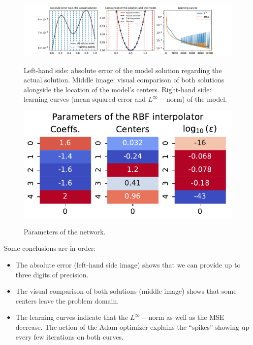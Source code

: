 \documentclass[12pt]{report} %
\begin{document}
\begin{figure}[ht]
  \hspace*{-2cm}
  {\includegraphics[width=1.25\textwidth, trim={2cm 0 2.5cm 0}, clip=true]
    {imagenes/experiments/1d/ode/ode_report.pdf}}
  \caption{Left-hand side: absolute error of the model solution regarding the actual
    solution. Middle image: visual comparison of both solutions alongside the location of the
    model's centers.
    Right-hand side: learning curves (mean squared error and $L^\infty-$norm) of the model.}
  \label{fig:solution-ode-1d}
\end{figure}


\begin{figure}
  \caption{Parameters of the network.\label{fig-parameters-ode-1d}}
  {\includegraphics[width=\textwidth]{imagenes/experiments/1d/ode/parameters_of_rbf_interpolator.pdf}}
\end{figure}

Some conclusions are in order:
\begin{itemize}
  \item The absolute error (left-hand side image) shows that we can provide up to three digits
        of precision.
  \item The visual comparison of both solutions (middle image) shows that
        some centers leave the problem domain.
  \item The learning curves indicate that the $L^\infty-$norm as well as the MSE decrease.
        The action of the Adam optimizer explains the ``spikes'' showing up every few iterations
        on both curves.
\end{itemize}
\end{document}
